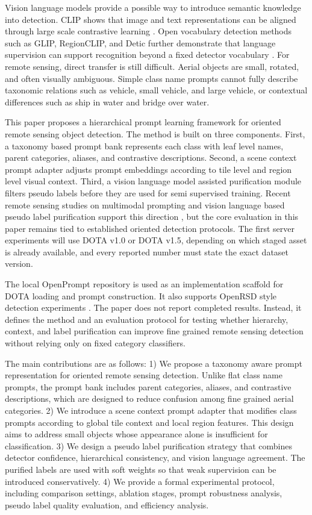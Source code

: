 \documentclass[10pt]{article}
\begin{document}
Vision language models provide a possible way to introduce semantic knowledge into detection. CLIP shows that image and text representations can be aligned through large scale contrastive learning \cite{radford2021clip}. Open vocabulary detection methods such as GLIP, RegionCLIP, and Detic further demonstrate that language supervision can support recognition beyond a fixed detector vocabulary \cite{li2022glip, zhong2022regionclip, zhou2022detic}. For remote sensing, direct transfer is still difficult. Aerial objects are small, rotated, and often visually ambiguous. Simple class name prompts cannot fully describe taxonomic relations such as vehicle, small vehicle, and large vehicle, or contextual differences such as ship in water and bridge over water.

This paper proposes a hierarchical prompt learning framework for oriented remote sensing object detection. The method is built on three components. First, a taxonomy based prompt bank represents each class with leaf level names, parent categories, aliases, and contrastive descriptions. Second, a scene context prompt adapter adjusts prompt embeddings according to tile level and region level visual context. Third, a vision language model assisted purification module filters pseudo labels before they are used for semi supervised training. Recent remote sensing studies on multimodal prompting and vision language based pseudo label purification support this direction \cite{rsmpod2026, semiearth2026}, but the core evaluation in this paper remains tied to established oriented detection protocols. The first server experiments will use DOTA v1.0 or DOTA v1.5, depending on which staged asset is already available, and every reported number must state the exact dataset version.

The local OpenPrompt repository is used as an implementation scaffold for DOTA loading and prompt construction. It also supports OpenRSD style detection experiments \cite{huang2025openrsd}. The paper does not report completed results. Instead, it defines the method and an evaluation protocol for testing whether hierarchy, context, and label purification can improve fine grained remote sensing detection without relying only on fixed category classifiers.

The main contributions are as follows: 
1) We propose a taxonomy aware prompt representation for oriented remote sensing detection. Unlike flat class name prompts, the prompt bank includes parent categories, aliases, and contrastive descriptions, which are designed to reduce confusion among fine grained aerial categories. 
2) We introduce a scene context prompt adapter that modifies class prompts according to global tile context and local region features. This design aims to address small objects whose appearance alone is insufficient for classification. 
3) We design a pseudo label purification strategy that combines detector confidence, hierarchical consistency, and vision language agreement. The purified labels are used with soft weights so that weak supervision can be introduced conservatively. 
4) We provide a formal experimental protocol, including comparison settings, ablation stages, prompt robustness analysis, pseudo label quality evaluation, and efficiency analysis.
\end{document}
